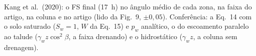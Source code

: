 \begin{table}[H]\centering\small
\caption{Kang et al.\ (2020): o FS final (17~h) no ângulo médio de cada zona, na faixa do artigo, na coluna e no artigo
(lido da Fig.~9, $\pm 0{,}05$). Conferência: a Eq.~14 com o solo saturado ($S_w = 1$, $W$ da Eq.~15) e $p_w$ analítico,
o do escoamento paralelo ao talude ($\gamma_w z\cos^2\beta$, a faixa drenando) e o hidrostático ($\gamma_w z$, a coluna
sem drenagem).}\label{tab:kangfaixa}
\resizebox{\textwidth}{!}{}
\end{table}

